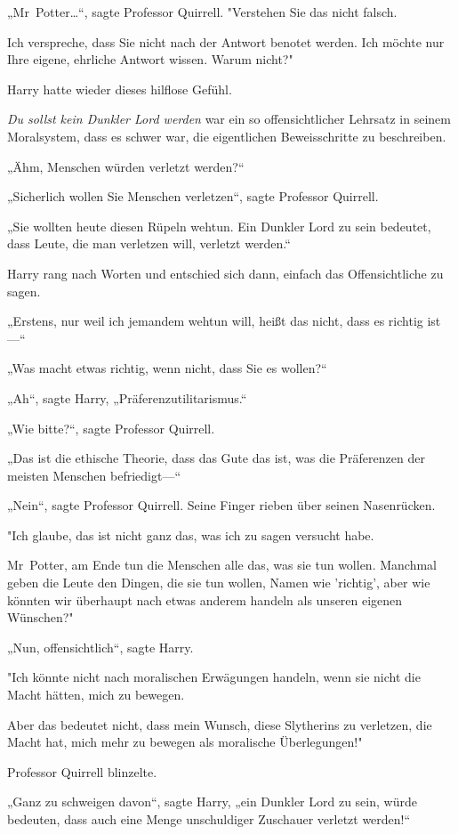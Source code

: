 {„Mr~Potter…“, sagte Professor Quirrell. "Verstehen Sie das nicht falsch.

Ich verspreche, dass Sie nicht nach der Antwort benotet werden. Ich möchte nur Ihre eigene, ehrliche Antwort wissen. Warum nicht?"

Harry hatte wieder dieses hilflose Gefühl.

\emph{Du sollst kein Dunkler Lord werden} war ein so offensichtlicher Lehrsatz in seinem Moralsystem, dass es schwer war, die eigentlichen Beweisschritte zu beschreiben.

„Ähm, Menschen würden verletzt werden?“

„Sicherlich wollen Sie Menschen verletzen“, sagte Professor Quirrell.

„Sie wollten heute diesen Rüpeln wehtun. Ein Dunkler Lord zu sein bedeutet, dass Leute, die man verletzen will, verletzt werden.“

Harry rang nach Worten und entschied sich dann, einfach das Offensichtliche zu sagen.

„Erstens, nur weil ich jemandem wehtun will, heißt das nicht, dass es richtig ist—“

„Was macht etwas richtig, wenn nicht, dass Sie es wollen?“

„Ah“, sagte Harry, „Präferenzutilitarismus.“

„Wie bitte?“, sagte Professor Quirrell.

„Das ist die ethische Theorie, dass das Gute das ist, was die Präferenzen der meisten Menschen befriedigt—“

„Nein“, sagte Professor Quirrell. Seine Finger rieben über seinen Nasenrücken.

"Ich glaube, das ist nicht ganz das, was ich zu sagen versucht habe.

Mr~Potter, am Ende tun die Menschen alle das, was sie tun wollen. Manchmal geben die Leute den Dingen, die sie tun wollen, Namen wie 'richtig', aber wie könnten wir überhaupt nach etwas anderem handeln als unseren eigenen Wünschen?"

„Nun, offensichtlich“, sagte Harry.

"Ich könnte nicht nach moralischen Erwägungen handeln, wenn sie nicht die Macht hätten, mich zu bewegen.

Aber das bedeutet nicht, dass mein Wunsch, diese Slytherins zu verletzen, die Macht hat, mich mehr zu bewegen als moralische Überlegungen!"

Professor Quirrell blinzelte.

„Ganz zu schweigen davon“, sagte Harry, „ein Dunkler Lord zu sein, würde bedeuten, dass auch eine Menge unschuldiger Zuschauer verletzt werden!“

}

